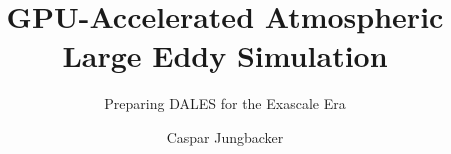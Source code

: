 \documentclass[11pt]{tudelft-report}
\begin{document}
\frontmatter

\title{GPU-Accelerated Atmospheric Large Eddy Simulation}
\subtitle{Preparing DALES for the Exascale Era}
\author{Caspar Jungbacker}


\makecover





\tableofcontents




\mainmatter















\appendix
\end{document}
